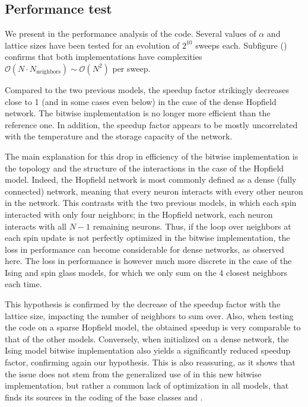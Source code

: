 \subsection{Performance test}
\myindent We present in  the performance analysis of the code. Several values of $\alpha$ and lattice sizes have been tested for an evolution of $2^{10}$ sweeps each.
Subfigure () confirms that both implementations have complexities $\mathcal{O}\left(N \cdot N_\text{neighbors}\right)\sim \mathcal{O}\left(N^2\right)$ per sweep.

Compared to the two previous models, the speedup factor strikingly decreases close to 1 (and in some cases even below) in the case of the dense Hopfield network. The bitwise implementation is no longer more efficient than the reference one. In addition, the speedup factor appears to be mostly uncorrelated with the temperature and the storage capacity of the network.

The main explanation for this drop in efficiency of the bitwise implementation is the topology and the structure of the interactions in the case of the Hopfield model. Indeed, the Hopfield network is most commonly defined as a dense (fully connected) network, meaning that every neuron interacts with every other neuron in the network. This contrasts with the two previous models, in which each spin interacted with only four neighbors; in the Hopfield network, each neuron interacts with all $N-1$ remaining neurons. Thus, if the loop over neighbors at each spin update is not perfectly optimized in the bitwise implementation, the loss in performance can become considerable for dense networks, as observed here. The loss in performance is however much more discrete in the case of the Ising and spin glass models, for which we only sum on the 4 closest neighbors each time.

This hypothesis is confirmed by the decrease of the speedup factor with the lattice size, impacting the number of neighbors to sum over. Also, when testing the code on a sparse Hopfield model, the obtained speedup is very comparable to that of the other models. Conversely, when initialized on a dense network, the Ising model bitwise implementation also yields a significantly reduced speedup factor, confirming again our hypothesis. This is also reassuring, as it shows that the issue does not stem from the generalized use of \UnsignedInt in this new bitwise implementation, but rather a common lack of optimization in all models, that finds its sources in the coding of the base classes \Bits and \UnsignedInt.

